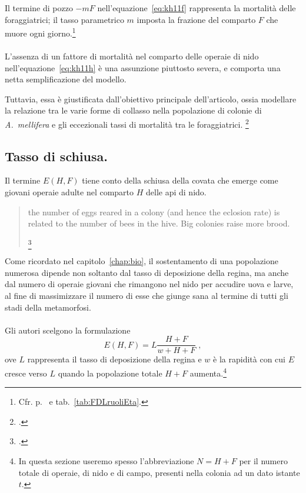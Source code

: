 Il termine di pozzo $-mF$ nell'equazione~\eqref{eq:kh11f} rappresenta la mortalità delle foraggiatrici;
il tasso parametrico $m$ imposta la frazione del comparto $F$ che muore ogni giorno.\footnote{Cfr. %
p.~\pageref{par:mInverseFlightspan} e tab.~\ref{tab:FDLruoliEta}.}



\paragraph{}
L'assenza di un fattore di mortalità nel comparto delle operaie di nido nell'equazione~\eqref{eq:kh11h} è
una assunzione piuttosto severa, e comporta una netta semplificazione del modello.

Tuttavia, essa è giustificata dall'obiettivo principale dell'articolo, ossia modellare la relazione tra le varie
forme di collasso nella popolazione di colonie di \emph{A.~mellifera} e gli eccezionali tassi di mortalità
tra le foraggiatrici.
\footcite[1,2,3,5]{khoury2011}

\subsection{Tasso di schiusa.}
Il termine $E(H,F)$ tiene conto della schiusa della covata che emerge come giovani operaie adulte nel
comparto $H$ delle api di nido.
\blockquote[{\footcite[2]{khoury2011}}]{\omissis the number of eggs reared in a colony (and hence the eclosion rate) is related to the number of bees in the hive. Big colonies raise more brood.}

Come ricordato nel capitolo~\ref{chap:bio}, il sostentamento di una popolazione numerosa dipende non soltanto
dal tasso di deposizione della regina, ma anche dal numero di operaie giovani che rimangono nel nido per
accudire uova e larve, al fine di massimizzare il numero di esse che giunge sana al termine di tutti gli stadi
della metamorfosi.

\paragraph{}
Gli autori scelgono la formulazione
\begin{equation}
    \label{eq:eclos}
    E(H,F) = L \frac{H+F}{w + H + F} \; ,
\end{equation}
ove $L$ rappresenta il tasso di deposizione della regina e $w$ è la rapidità con cui $E$ cresce verso $L$ quando
la popolazione totale $H+F$ aumenta.\footnote{In questa sezione useremo spesso l'abbreviazione
$N=H+F$ per il numero totale di operaie, di nido e di campo, presenti nella colonia ad un dato istante $t$.}

